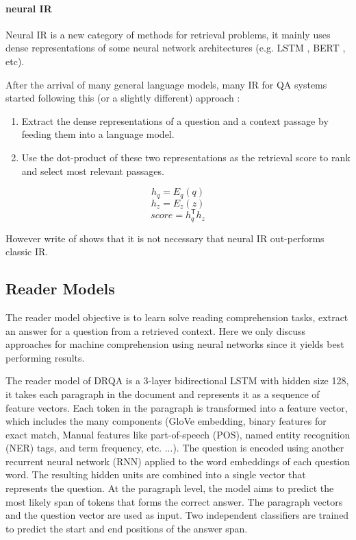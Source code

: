 \documentclass[a4paper,12pt]{article}
\begin{document}
\paragraph{neural IR}
Neural IR is a new category of methods for retrieval problems, it mainly uses dense representations of some neural network architectures (e.g. LSTM \cite{lstm}, BERT \cite{bert}, etc). 

After the arrival of many general language models, many IR for QA systems started following this (or a slightly different) approach :
\begin{enumerate}
	\item Extract the dense representations of a question and a context passage by feeding them into a language model.
	\item Use the dot-product of these two representations as the retrieval score to rank and select most relevant passages.
\end{enumerate}

$$h_q=E_q(q)$$ 
$$h_z=E_z(z)$$
$$score=h_q^\mathsf{T} h_z$$

However write of \cite{lin} shows that it is not necessary that neural IR out-performs classic IR.

\subsection{Reader Models}
The reader model objective is to learn solve reading comprehension tasks, extract an answer for a question from a retrieved context. 
Here we only discuss approaches for machine comprehension using neural networks since it yields best performing results.

The reader model of DRQA \cite{drqa} is a 3-layer bidirectional LSTM with hidden size 128, it takes each paragraph in the document and represents it as a sequence of feature vectors. 
Each token in the paragraph is transformed into a feature vector, which includes the many components (GloVe \cite{glove} embedding, binary features for exact match, Manual features like part-of-speech (POS), named entity recognition (NER) tags, and term frequency, etc. ...).
The question is encoded using another recurrent neural network (RNN) applied to the word embeddings of each question word. The resulting hidden units are combined into a single vector that represents the question. At the paragraph level, the model aims to predict the most likely span of tokens that forms the correct answer. The paragraph vectors and the question vector are used as input. 
Two independent classifiers are trained to predict the start and end positions of the answer span.
\end{document}
